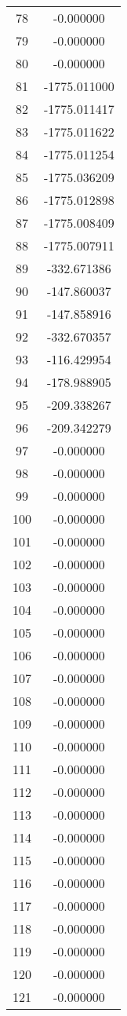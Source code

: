 \documentclass[12pt]{article}
\begin{document}
\begin{longtable}{@{}cc@{}}
78 & -0.000000 \\
79 & -0.000000 \\
80 & -0.000000 \\
81 & -1775.011000 \\
82 & -1775.011417 \\
83 & -1775.011622 \\
84 & -1775.011254 \\
85 & -1775.036209 \\
86 & -1775.012898 \\
87 & -1775.008409 \\
88 & -1775.007911 \\
89 & -332.671386 \\
90 & -147.860037 \\
91 & -147.858916 \\
92 & -332.670357 \\
93 & -116.429954 \\
94 & -178.988905 \\
95 & -209.338267 \\
96 & -209.342279 \\
97 & -0.000000 \\
98 & -0.000000 \\
99 & -0.000000 \\
100 & -0.000000 \\
101 & -0.000000 \\
102 & -0.000000 \\
103 & -0.000000 \\
104 & -0.000000 \\
105 & -0.000000 \\
106 & -0.000000 \\
107 & -0.000000 \\
108 & -0.000000 \\
109 & -0.000000 \\
110 & -0.000000 \\
111 & -0.000000 \\
112 & -0.000000 \\
113 & -0.000000 \\
114 & -0.000000 \\
115 & -0.000000 \\
116 & -0.000000 \\
117 & -0.000000 \\
118 & -0.000000 \\
119 & -0.000000 \\
120 & -0.000000 \\
121 & -0.000000 \\

\end{longtable}
\end{document}
